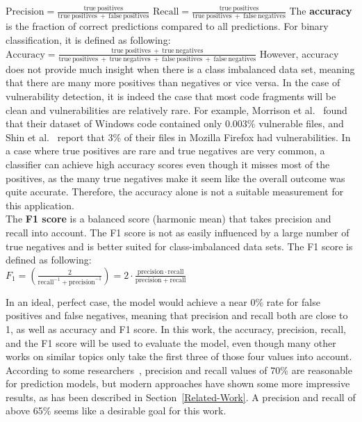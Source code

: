 \documentclass[
a4paper,
pagesize,
pdftex,
12pt,
twoside, %
BCOR=5mm, %
ngerman,
fleqn,
final,
]{scrartcl}
\begin{document}
	\mbox{}\newline
	$ \mathrm{Precision} = \frac{\mathrm{true~positives}}{\mathrm{true~positives}~+~\mathrm{false~positives}}$\newline
	\mbox{}\newline
	$\mathrm{Recall} = \frac{\mathrm{true~positives}}{\mathrm{true~positives}~+~\mathrm{false~negatives}}$\newline
	\mbox{}\newline
	The \textbf{accuracy} is the fraction of correct predictions compared to all predictions. For binary classification, it is defined as following:  \newline
	\mbox{}\newline
	$\mathrm{Accuracy} = \frac{\mathrm{true~positives}~+~\mathrm{true~negatives}}{\mathrm{true~positives}~+~\mathrm{true~negatives}~+~\mathrm{false~positives}~+~\mathrm{false~negatives}}$\newline
	\mbox{}\newline
	However, accuracy does not provide much insight when there is a class imbalanced data set, meaning that there are many more positives than negatives or vice versa. In the case of vulnerability detection, it is indeed the case that most code fragments will be clean and vulnerabilities are relatively rare. For example, Morrison et al.~\cite{Morrison.2015} found that their dataset of Windows code contained only 0.003\% vulnerable files, and Shin et al.~\cite{Shin.2010} report that 3\% of their files in Mozilla Firefox had vulnerabilities. In a case where true positives are rare and true negatives are very common, a classifier can achieve high accuracy scores even though it misses most of the positives, as the many true negatives make it seem like the overall outcome was quite accurate. Therefore, the accuracy alone is not a suitable measurement for this application.\\
	The \textbf{F1 score} is a balanced score (harmonic mean) that takes precision and recall into account. The F1 score is not as easily influenced by a large number of true negatives and is better suited for class-imbalanced data sets. The F1 score is defined as following:\\
	\mbox{}\newline
	$ F_{1}=\left({\frac {2}{\mathrm {recall} ^{-1}+\mathrm {precision} ^{-1}}}\right)=2\cdot {\frac {\mathrm {precision} \cdot \mathrm {recall} }{\mathrm {precision} +\mathrm {recall} }}$
	
	
	In an ideal, perfect case, the model would achieve a near 0\% rate for false positives and false negatives, meaning that precision and recall both are close to 1, as well as accuracy and F1 score. In this work, the accuracy, precision, recall, and the F1 score will be used to evaluate the model, even though many other works on similar topics only take the first three of those four values into account.\\
	According to some researchers~\cite{Morrison.2015,Shin.2013,Neuhaus.2007}, precision and recall values of 70\% are reasonable for prediction models, but modern approaches have shown some more impressive results, as has been described in Section~\ref{Related-Work}. A precision and recall of above 65\% seems like a desirable goal for this work.
	
\end{document}
